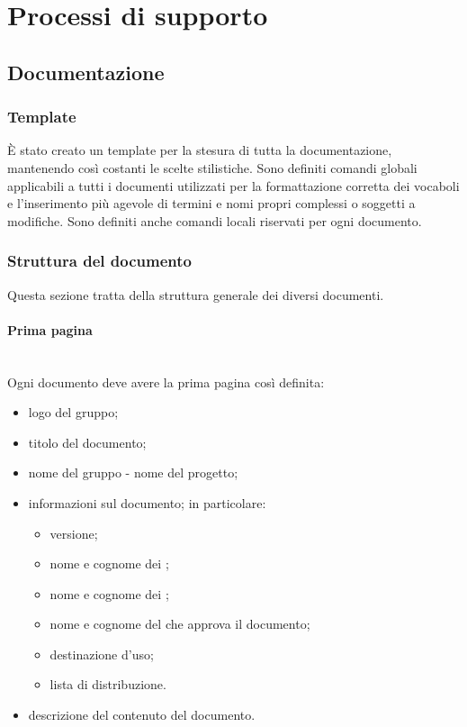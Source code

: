 \section{Processi di supporto}
\subsection{Documentazione}

\subsubsection{Template}
È stato creato un template \glossario{\LaTeX{}} per la stesura di tutta la documentazione, mantenendo così costanti le scelte stilistiche.
Sono definiti comandi globali applicabili a tutti i documenti utilizzati per la formattazione corretta dei vocaboli e l'inserimento più agevole di termini e nomi propri complessi o soggetti a modifiche. Sono definiti anche comandi locali riservati per ogni documento.

\subsubsection{Struttura del documento}
Questa sezione tratta della struttura generale dei diversi documenti.

\paragraph{Prima pagina}\mbox{}\\
Ogni documento deve avere la prima pagina così definita:
\begin{itemize}
\item logo del gruppo;
\item titolo del documento;
\item nome del gruppo - nome del progetto;
\item informazioni sul documento; in particolare:
	\begin{itemize}
		\item versione;
		\item nome e cognome dei \Redattori{};
		\item nome e cognome dei \Verificatori{};
		\item nome e cognome del \Responsabile{} che approva il documento;
		\item destinazione d'uso;
		\item lista di distribuzione. 
	\end{itemize}
\item descrizione del contenuto del documento.
\end{itemize}

